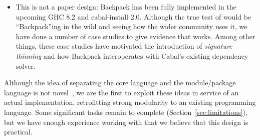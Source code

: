 \begin{itemize}
    \item This is not a paper design: Backpack has been fully
    implemented in the upcoming GHC 8.2 and cabal-install 2.0.  Although
    the true test of \Backpack{} would be
    ``Backpack''ing in the wild and seeing how the wider community
    uses it, we have done a number of case studies to give evidence
    that \Backpack{} works.  Among other things, these case studies
    have motivated the introduction of \emph{signature thinning}
    and how Backpack interoperates with Cabal's existing dependency
    solver.

\end{itemize}
%
Although the idea of separating the core language and the module/package
language is not novel~\cite{leroy:modular,milner+:def-of-sml-revised,rossberg+:f-ing}, we are the first to exploit these ideas in service
of an actual implementation, retrofitting strong modularity to an existing
programming language.  Some significant tasks remain to complete \Backpack{}
(Section~\ref{sec:limitations}),
but we have enough experience working with \Backpack{} that we believe that
this design is practical.




